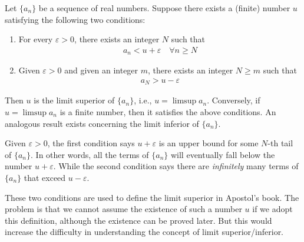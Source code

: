 \documentclass[thmcnt=section, 12pt]{my-elegantbook}
\begin{document}
\begin{theorem} \label{thm:58}
    Let $\{a_n\}$ be a sequence of real numbers. Suppose there exists a (finite) number $u$ satisfying the following two conditions:
    \begin{enumerate}
        \item For every $\varepsilon > 0$, there exists an integer $N$ such that
              \begin{align*}
                  a_n < u + \varepsilon
                  \quad \forall n \geq N
              \end{align*}
        \item Given $\varepsilon > 0$ and given an integer $m$, there exists an integer $N \geq m$ such that
              \begin{align*}
                  a_N > u - \varepsilon
              \end{align*}
    \end{enumerate}
    Then $u$ is the limit superior of $\{a_n\}$, i.e., $u = \limsup a_n$. Conversely, if $u = \limsup a_n$ is a finite number, then it satisfies the above conditions. An analogous result exists concerning the limit inferior of $\{a_n\}$.
\end{theorem}

Given $\varepsilon > 0$, the first condition says $u+\varepsilon$ is an upper bound for some $N$-th tail of $\{a_n\}$. In other words, all the terms of $\{a_n\}$ will eventually fall below the number $u + \varepsilon$. While the second condition says there are \textit{infinitely} many terms of $\{a_n\}$ that exceed $u - \varepsilon$.

\begin{note}
    These two conditions are used to define the limit superior in Apostol's book\cite{apostolMathematicalAnalysisModern1974}. The problem is that we cannot assume the existence of such a number $u$ if we adopt this definition, although the existence can be proved later. But this would increase the difficulty in understanding the concept of limit superior/inferior.
\end{note}
\end{document}
